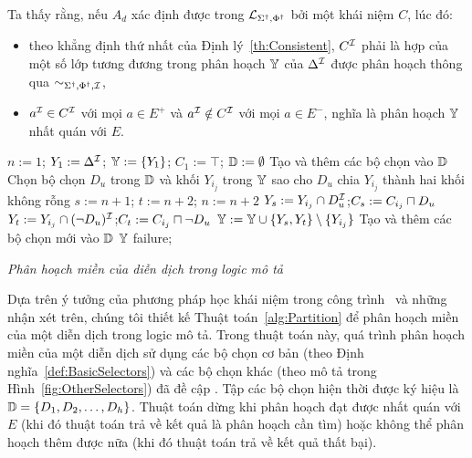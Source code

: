 Ta thấy rằng, nếu $A_d$ xác định được trong $\mathcal{L}_{\Sigma^\dag,\Phi^\dag}$ bởi một khái niệm $C$, lúc đó:
\begin{itemize}
	\item theo khẳng định thứ nhất của Định lý~\ref{th:Consistent}, $C^{\mathcal{I}}$ phải là hợp của một số lớp tương đương trong phân hoạch $\mathbb{Y}$ của $\Delta^{\mathcal{I}}$ được phân hoạch thông qua $\sim_{\Sigma^\dag,\Phi^\dag,\mathcal{I}}$,
	
	\item $a^{\mathcal{I}} \in C^{\mathcal{I}}$ với mọi $a \in E^+$ và $a^{\mathcal{I}} \notin C^{\mathcal{I}}$ với mọi $a \in E^-$, nghĩa là phân hoạch $\mathbb{Y}$ nhất quán với $E$.
\end{itemize}

\begin{algorithm}[t]
	$n:=1$; $Y_1 := \Delta^{\mathcal{I}}$; $\mathbb{Y} := \{Y_1\}$; $C_1 := \top$; $\mathbb{D} := \emptyset$\;
	Tạo và thêm các bộ chọn vào $\mathbb{D}$\label{step:CreateSelector1}
	{
		Chọn bộ chọn $D_u$ trong $\mathbb{D}$ và khối $Y_{i_j}$ trong $\mathbb{Y}$ sao cho $D_u$ chia $Y_{i_j}$ thành hai khối không rỗng\label{step:ChooseBlock}\;
		$s:=n+1$; $t:=n+2$; $n:=n+2$\;
		$Y_s := Y_{i_j} \cap D_u^{\mathcal{I}}$;\qquad\quad\!$C_s := C_{i_j} \sqcap D_u$\;
		$Y_t := Y_{i_j} \cap (\neg D_u)^{\mathcal{I}}$;\quad $C_t := C_{i_j} \sqcap \neg D_u$\;
		$\mathbb{Y} := \mathbb{Y} \cup \{Y_s, Y_t\} \setminus \{Y_{i_j}\}$\;    
		Tạo và thêm các bộ chọn mới vào $\mathbb{D}$\label{step:CreateSelector2}
	}
	{
		\Return $\mathbb{Y}$\;
	}
	{
		\Return failure;
	}
	\caption{{\em Phân hoạch miền của diễn dịch trong logic mô tả}} \label{alg:Partition}
\end{algorithm}

Dựa trên ý tưởng của phương pháp học khái niệm trong công trình~\cite{Nguyen2013} và những nhận xét trên, chúng tôi thiết kế Thuật toán~\ref{alg:Partition} để phân hoạch miền của một diễn dịch trong logic mô tả.
Trong thuật toán này, quá trình phân hoạch miền của một diễn dịch sử dụng các bộ chọn cơ bản (theo Định nghĩa~\ref{def:BasicSelectors}) và các bộ chọn khác (theo mô tả trong Hình~\ref{fig:OtherSelectors}) đã đề cập . Tập các bộ chọn hiện thời được ký hiệu là $\mathbb{D} = \{D_1, D_2, \ldots, D_h\}$. Thuật toán dừng khi phân hoạch đạt được nhất quán với $E$ (khi đó thuật toán trả về kết quả là phân hoạch cần tìm) hoặc không thể phân hoạch thêm được nữa (khi đó thuật toán trả về kết quả thất bại).

